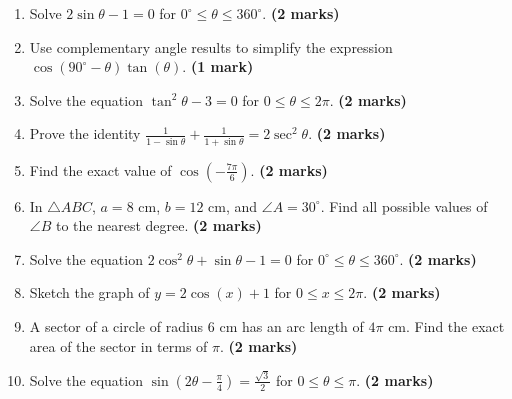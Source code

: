\documentclass{article}
\begin{document}
\begin{enumerate}
    \item Solve $2\sin \theta - 1 = 0$ for $0^\circ \le \theta \le 360^\circ$. \hfill \textbf{(2 marks)}
    \vspace{0.5cm}

    \item Use complementary angle results to simplify the expression $\cos(90^\circ - \theta)\tan(\theta)$. \hfill \textbf{(1 mark)}
    \vspace{0.5cm}

    \item Solve the equation $\tan^2 \theta - 3 = 0$ for $0 \le \theta \le 2\pi$. \hfill \textbf{(2 marks)}
    \vspace{0.5cm}

    \item Prove the identity $\frac{1}{1 - \sin \theta} + \frac{1}{1 + \sin \theta} = 2\sec^2 \theta$. \hfill \textbf{(2 marks)}
    \vspace{0.5cm}

    \item Find the exact value of $\cos\left(-\frac{7\pi}{6}\right)$. \hfill \textbf{(2 marks)}
    \vspace{0.5cm}

    \item In $\triangle ABC$, $a = 8\text{ cm}$, $b = 12\text{ cm}$, and $\angle A = 30^\circ$. Find all possible values of $\angle B$ to the nearest degree. \hfill \textbf{(2 marks)}
    \vspace{0.5cm}

    \item Solve the equation $2\cos^2 \theta + \sin \theta - 1 = 0$ for $0^\circ \le \theta \le 360^\circ$. \hfill \textbf{(2 marks)}
    \vspace{0.5cm}

    \item Sketch the graph of $y = 2\cos(x) + 1$ for $0 \le x \le 2\pi$. \hfill \textbf{(2 marks)}
    \vspace{0.5cm}

    \item A sector of a circle of radius $6\text{ cm}$ has an arc length of $4\pi\text{ cm}$. Find the exact area of the sector in terms of $\pi$. \hfill \textbf{(2 marks)}
    \vspace{0.5cm}

    \item Solve the equation $\sin\left(2\theta - \frac{\pi}{4}\right) = \frac{\sqrt{3}}{2}$ for $0 \le \theta \le \pi$. \hfill \textbf{(2 marks)}
    \vspace{0.5cm}


\end{enumerate}
\end{document}
